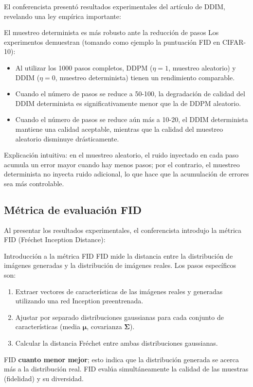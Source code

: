 El conferencista presentó resultados experimentales del artículo de DDIM, revelando una ley empírica importante:

\begin{importantbox}{El muestreo determinista es más robusto ante la reducción de pasos}
Los experimentos demuestran (tomando como ejemplo la puntuación FID en CIFAR-10):
\begin{itemize}
    \item Al utilizar los 1000 pasos completos, DDPM ($\eta=1$, muestreo aleatorio) y DDIM ($\eta=0$, muestreo determinista) tienen un rendimiento comparable.
    \item Cuando el número de pasos se reduce a 50-100, la degradación de calidad del DDIM determinista es significativamente menor que la de DDPM aleatorio.
    \item Cuando el número de pasos se reduce aún más a 10-20, el DDIM determinista mantiene una calidad aceptable, mientras que la calidad del muestreo aleatorio disminuye drásticamente.
\end{itemize}
Explicación intuitiva: en el muestreo aleatorio, el ruido inyectado en cada paso acumula un error mayor cuando hay menos pasos; por el contrario, el muestreo determinista no inyecta ruido adicional, lo que hace que la acumulación de errores sea más controlable.
\end{importantbox}

\subsection{Métrica de evaluación FID}

Al presentar los resultados experimentales, el conferencista introdujo la métrica FID (Fr\'{e}chet Inception Distance):

\begin{knowledgebox}{Introducción a la métrica FID}
FID mide la distancia entre la distribución de imágenes generadas y la distribución de imágenes reales. Los pasos específicos son:
\begin{enumerate}
    \item Extraer vectores de características de las imágenes reales y generadas utilizando una red Inception preentrenada.
    \item Ajustar por separado distribuciones gaussianas para cada conjunto de características (media $\boldsymbol{\mu}$, covarianza $\boldsymbol{\Sigma}$).
    \item Calcular la distancia Fr\'{e}chet entre ambas distribuciones gaussianas.
\end{enumerate}
FID \textbf{cuanto menor mejor}; esto indica que la distribución generada se acerca más a la distribución real. FID evalúa simultáneamente la calidad de las muestras (fidelidad) y su diversidad.
\end{knowledgebox}

